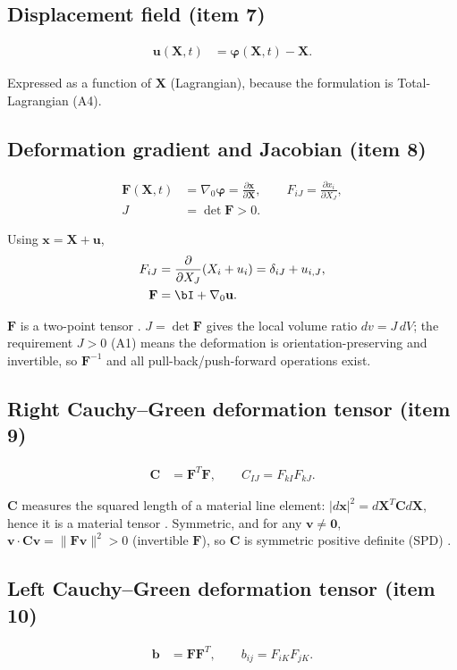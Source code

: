 \documentclass[11pt]{article}
\newcommand{\gradz}{\nabla_{0}}
\newcommand{\bX}{\mathbf{X}}
\newcommand{\bx}{\mathbf{x}}
\newcommand{\bp}{\boldsymbol{\varphi}}
\newcommand{\bu}{\mathbf{u}}
\newcommand{\bF}{\mathbf{F}}
\newcommand{\bC}{\mathbf{C}}
\newcommand{\bb}{\mathbf{b}}
\newcommand{\gradz}{\nabla_{0}}
\newcommand{\bX}{\mathbf{X}}
\newcommand{\bx}{\mathbf{x}}
\newcommand{\bp}{\boldsymbol{\varphi}}
\newcommand{\bu}{\mathbf{u}}
\newcommand{\bF}{\mathbf{F}}
\newcommand{\bC}{\mathbf{C}}
\newcommand{\bb}{\mathbf{b}}
\begin{document}
\subsection{Displacement field (item 7)}
\begin{align}
\bu(\bX,t) &= \bp(\bX,t) - \bX.
\label{eq:n_disp}
\end{align}

Expressed as a function of $\bX$ (Lagrangian), because the formulation
is Total-Lagrangian (A4).

\subsection{Deformation gradient and Jacobian (item 8)}
\begin{align}
\bF(\bX,t) &= \gradz\bp = \frac{\partial\bx}{\partial\bX},
\qquad F_{iJ}=\frac{\partial x_{i}}{\partial X_{J}},
\label{eq:n_F}\\
J &= \det\bF > 0.
\label{eq:n_J}
\end{align}

Using $\bx=\bX+\bu$,
\begin{align}
F_{iJ} &= \frac{\partial}{\partial X_{J}}(X_{i}+u_{i})
        = \delta_{iJ} + u_{i,J},
\label{eq:n_Fdec}\\
\bF &= \bI + \gradz\bu.
\label{eq:n_Fdec_t}
\end{align}

$\bF$ is a two-point tensor \cite{Holzapfel2000}. $J=\det\bF$ gives the
local volume ratio $dv=J\,dV$; the requirement $J>0$ (A1) means the
deformation is orientation-preserving and invertible, so $\bF^{-1}$ and
all pull-back/push-forward operations exist.

\subsection{Right Cauchy--Green deformation tensor (item 9)}
\begin{align}
\bC &= \bF^{T}\bF,\qquad C_{IJ}=F_{kI}F_{kJ}.
\label{eq:n_C}
\end{align}

$\bC$ measures the squared length of a material line element:
$|d\bx|^{2}=d\bX^{T}\bC d\bX$, hence it is a material tensor
\cite{Holzapfel2000}. Symmetric, and for any $\mathbf{v}\neq\mathbf{0}$,
$\mathbf{v}\cdot\bC\mathbf{v}=\|\bF\mathbf{v}\|^{2}>0$ (invertible
$\bF$), so $\bC$ is symmetric positive definite (SPD) \checkmark.

\subsection{Left Cauchy--Green deformation tensor (item 10)}
\begin{align}
\bb &= \bF\bF^{T},\qquad b_{ij}=F_{iK}F_{jK}.
\label{eq:n_b}
\end{align}
\end{document}
